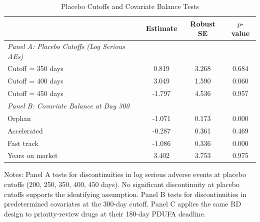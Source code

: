 \begin{table}[H]
\centering
\caption{Placebo Cutoffs and Covariate Balance Tests}
\begin{threeparttable}
\begin{tabular}{lccc}
\toprule
 & Estimate & Robust SE & $p$-value \\
\midrule
\emph{Panel A: Placebo Cutoffs (Log Serious AEs)} & & & \\
Cutoff = 350 days & 0.819 & 3.268 & 0.684 \\
Cutoff = 400 days & 3.049 & 1.590 & 0.060 \\
Cutoff = 450 days & -1.797 & 4.536 & 0.957 \\
\addlinespace
\emph{Panel B: Covariate Balance at Day 300} & & & \\
Orphan & -1.071 & 0.173 & 0.000 \\
Accelerated & -0.287 & 0.361 & 0.469 \\
Fast track & -1.086 & 0.336 & 0.000 \\
Years on market & 3.402 & 3.753 & 0.975 \\
\bottomrule
\end{tabular}
\begin{tablenotes}[flushleft]
\small
\item Notes: Panel A tests for discontinuities in log serious adverse events at placebo cutoffs (200, 250, 350, 400, 450 days). No significant discontinuity at placebo cutoffs supports the identifying assumption. Panel B tests for discontinuities in predetermined covariates at the 300-day cutoff. Panel C applies the same RD design to priority-review drugs at their 180-day PDUFA deadline.
\end{tablenotes}
\end{threeparttable}
\label{tab:placebo}
\end{table}
